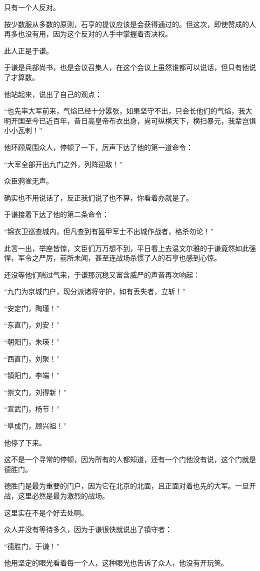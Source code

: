 \begin{multicols}{\theparacolNo}
只有一个人反对。

按少数服从多数的原则，石亨的提议应该是会获得通过的。但这次，即使赞成的人再多也没有用，因为这个反对的人手中掌握着否决权。

此人正是于谦。

于谦是兵部尚书，也是会议召集人，在这个会议上虽然谁都可以说话，但只有他说了才算数。

他站起来，说出了自己的观点：

“也先率大军前来，气焰已经十分嚣张，如果坚守不出，只会长他们的气焰，我大明开国至今已近百年，昔日高皇帝布衣出身，尚可纵横天下，横扫暴元，我辈岂惧小小瓦剌！”

他环顾周围众人，停顿了一下，厉声下达了他的第一道命令：

“大军全部开出九门之外，列阵迎敌！”

众臣鸦雀无声。

确实也不用说话了，反正我们说了也不算，你看着办就是了。

于谦接着下达了他的第二条命令：

“锦衣卫巡查城内，但凡查到有盔甲军士不出城作战者，格杀勿论！”

此言一出，举座皆惊，文臣们万万想不到，平日看上去温文尔雅的于谦竟然如此强悍，军令之严厉，前所未闻，甚至连战场杀惯了人的石亨也感到心惊。

还没等他们喘过气来，于谦那沉稳又富含威严的声音再次响起：

“九门为京城门户，现分派诸将守护，如有丢失者，立斩！”

“安定门，陶瑾！”

“东直门，刘安！”

“朝阳门，朱瑛！”

“西直门，刘聚！”

“镇阳门，李端！”

“崇文门，刘得新！”

“宣武门，杨节！”

“阜成门，顾兴祖！”

他停了下来。

这不是一个寻常的停顿，因为所有的人都知道，还有一个门他没有说，这个门就是德胜门。

德胜门是最为重要的门户，因为它在北京的北面，且正面对着也先的大军。一旦开战，这里必然是最为激烈的战场。

这里实在不是个好去处啊。

众人并没有等待多久，因为于谦很快就说出了镇守者：

“德胜门，于谦！”

他用坚定的眼光看着每一个人，这种眼光也告诉了众人，他没有开玩笑。


\end{multicols}
